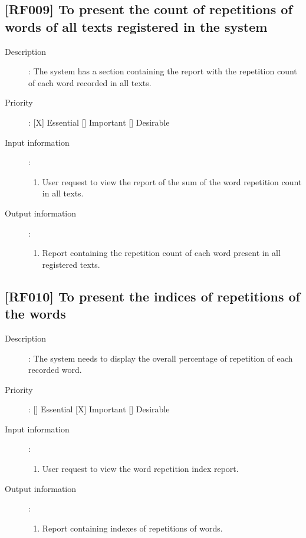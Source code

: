 \documentclass[11pt, twoside, a4paper]{book}
\begin{document}
			\subsection{[RF009] To present the count of repetitions of words of all texts registered in the system}
				
				\begin{description}
						
					\item[Description]: The system has a section containing the report with the repetition count of each word recorded in all texts.
					\item[Priority]: [X] Essential [] Important [] Desirable
					\item[Input information]:
						\begin{enumerate}

							\item User request to view the report of the sum of the word repetition count in all texts.
							
						\end{enumerate}
					\item[Output information]:
						\begin{enumerate}

							\item Report containing the repetition count of each word present in all registered texts.
																					
						\end{enumerate}
	
				\end{description}

			\subsection{[RF010] To present the indices of repetitions of the words}
				
				\begin{description}
						
					\item[Description]: The system needs to display the overall percentage of repetition of each recorded word.
					\item[Priority]: [] Essential [X] Important [] Desirable
					\item[Input information]:
						\begin{enumerate}

							\item User request to view the word repetition index report.
							
						\end{enumerate}
					\item[Output information]:
						\begin{enumerate}

							\item Report containing indexes of repetitions of words.
																					
						\end{enumerate}
	
				\end{description}
		
\end{document}
